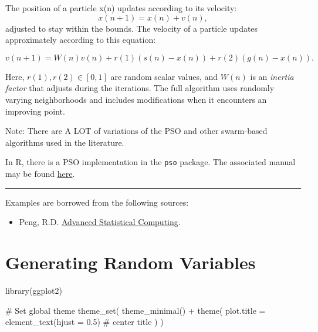 \documentclass[
  letterpaper,
  DIV=11,
  numbers=noendperiod]{scrreprt}
\newenvironment{Shaded}{\begin{snugshade}}{\end{snugshade}}
\newcommand{\AttributeTok}[1]{\textcolor[rgb]{0.40,0.45,0.13}{#1}}
\newcommand{\CommentTok}[1]{\textcolor[rgb]{0.37,0.37,0.37}{#1}}
\newcommand{\FloatTok}[1]{\textcolor[rgb]{0.68,0.00,0.00}{#1}}
\newcommand{\FunctionTok}[1]{\textcolor[rgb]{0.28,0.35,0.67}{#1}}
\newcommand{\NormalTok}[1]{\textcolor[rgb]{0.00,0.23,0.31}{#1}}
\newcommand{\SpecialCharTok}[1]{\textcolor[rgb]{0.37,0.37,0.37}{#1}}
\providecommand{\tightlist}{%
  \setlength{\itemsep}{0pt}\setlength{\parskip}{0pt}}
\begin{document}
The position of a particle x(n) updates according to its velocity:
\[x(n+1)=x(n)+v(n),\] adjusted to stay within the bounds. The velocity
of a particle updates approximately according to this equation:

\[v(n+1) = W(n)v(n)+r(1)(s(n)−x(n))+r(2)(g(n)−x(n)).\]

Here, \(r(1),r(2) \in [0,1]\) are random scalar values, and \(W(n)\) is
an \emph{inertia factor} that adjusts during the iterations. The full
algorithm uses randomly varying neighborhoods and includes modifications
when it encounters an improving point.

Note: There are A LOT of variations of the PSO and other swarm-based
algorithms used in the literature.

In R, there is a PSO implementation in the \texttt{pso} package. The
associated manual may be found
\href{https://cran.r-project.org/web/packages/pso/pso.pdf}{here}.

\begin{center}\rule{0.5\linewidth}{0.5pt}\end{center}

Examples are borrowed from the following sources:

\begin{itemize}
\tightlist
\item
  Peng, R.D. \href{https://bookdown.org/rdpeng/advstatcomp/}{Advanced
  Statistical Computing}.
\end{itemize}


\chapter{Generating Random Variables}\label{generating-random-variables}

\newcommand{\unif}{\operatorname{Unif}}
\newcommand{\geom}{\operatorname{Geom}}
\newcommand{\beta}{\operatorname{Beta}}

\begin{Shaded}
\begin{Highlighting}[]
\FunctionTok{library}\NormalTok{(ggplot2)}

\CommentTok{\# Set global theme}
\FunctionTok{theme\_set}\NormalTok{(}
  \FunctionTok{theme\_minimal}\NormalTok{() }\SpecialCharTok{+}
    \FunctionTok{theme}\NormalTok{(}
      \AttributeTok{plot.title =} \FunctionTok{element\_text}\NormalTok{(}\AttributeTok{hjust =} \FloatTok{0.5}\NormalTok{)  }\CommentTok{\# center title}
\NormalTok{    )}
\NormalTok{)}
\end{Highlighting}
\end{Shaded}
\end{document}
